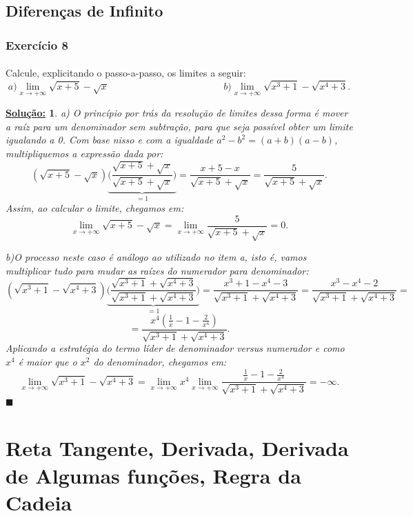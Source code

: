 \documentclass{article}
\newtheorem*{sol*}{\underline{Solu\c c\~ao:}}
\renewcommand\qedsymbol{$\blacksquare$}
\begin{document}
\subsection{Diferen\c cas de Infinito}
\subsubsection{Exerc\'icio 8}
\paragraph{} Calcule, explicitando o passo-a-passo, os limites a seguir:
$$
	a) \lim_{x\to+\infty} \sqrt{x + 5} - \sqrt{x} \hspace{5cm} b)\lim_{x\to+\infty} \sqrt{x^3 + 1} - \sqrt{x^4 + 3}.
$$
\begin{sol*}
	a) O princ\'ipio por tr\'as da resolu\c c\~ao de limites dessa forma \'e mover a ra\'iz para um denominador sem subtra\c c\~ao, para que seja poss\'ivel obter um limite igualando a 0. Com base nisso e com a igualdade $a^2 - b^2 = (a + b)(a - b)$, multipliquemos a express\~ao dada por:
	$$
		(\sqrt{x + 5} - \sqrt{x})\underbrace{\biggl(\frac{\sqrt{x + 5} + \sqrt{x}}{\sqrt{x + 5} + \sqrt{x}}\biggr)}_{= 1} = \frac{x + 5 - x}{\sqrt{x + 5} + \sqrt{x}} = \frac{5}{\sqrt{x + 5} + \sqrt{x}}.
	$$
	Assim, ao calcular o limite, chegamos em:
	$$
		\lim_{x\to+\infty} \sqrt{x + 5} - \sqrt{x} = \lim_{x\to+\infty} \frac{5}{\sqrt{x + 5} + \sqrt{x}} = 0.
	$$

	b)O processo neste caso \'e an\'alogo ao utilizado no item a, isto \'e, vamos multiplicar tudo para mudar as ra\'izes do numerador para denominador:
	$$
		(\sqrt{x^3 + 1} - \sqrt{x^4 + 3})\underbrace{\biggl(\frac{\sqrt{x^3 + 1} + \sqrt{x^4 + 3}}{\sqrt{x^3 + 1} + \sqrt{x^4 + 3}}\biggr)}_{= 1} = \frac{x^3 + 1 - x^4 - 3}{\sqrt{x^3 + 1} + \sqrt{x^4 + 3}} = \frac{x^3 - x^4 - 2}{\sqrt{x^3 + 1} + \sqrt{x^4 + 3}} =
	$$
	$$
		= \frac{x^4(\frac{1}{x} - 1 - \frac{2}{x^4})}{\sqrt{x^3 + 1} + \sqrt{x^4 + 3}}.
	$$
	Aplicando a estrat\'egia do termo l\'ider de denominador versus numerador e como $x^4$ \'e maior que o $x^2$ do denominador, chegamos em:
	$$
		\lim_{x\to+\infty} \sqrt{x^3 + 1} - \sqrt{x^4 + 3} = \lim_{x\to+\infty}x^4\lim_{x\to+\infty}\frac{\frac{1}{x} - 1 - \frac{2}{x^4}}{\sqrt{x^3 + 1} + \sqrt{x^4 + 3}} = -\infty.
	$$
	\qedsymbol
\end{sol*}

\section{Reta
  Tangente,
  Derivada,
  Derivada
  de
  Algumas
  fun\c
  c\~oes,
  Regra
  da
  Cadeia}
\end{document}
